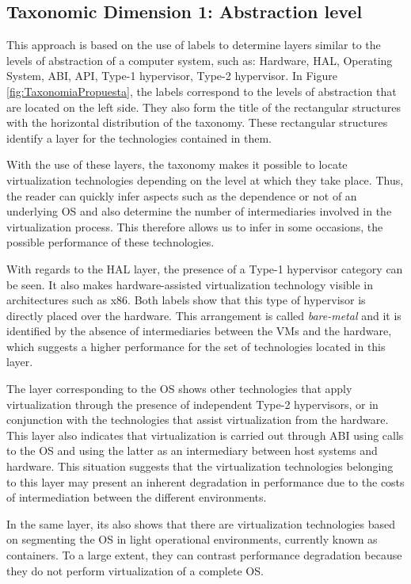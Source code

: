 	
	
	\subsection{Taxonomic Dimension 1: Abstraction level}

	This approach is based on the use of labels to determine layers similar to the levels of abstraction of a computer system, such as: Hardware, HAL, Operating System, ABI, API, Type-1 hypervisor, Type-2 hypervisor.   In Figure \ref{fig:TaxonomiaPropuesta}, the labels correspond to the levels of abstraction that are located on the left side. They also form the title of the rectangular structures with the horizontal distribution of the taxonomy. These rectangular structures identify a layer for the technologies contained in them.
	
	With the use of these layers, the taxonomy makes it possible to locate virtualization technologies depending on the level at which they take place. Thus, the reader can quickly infer aspects such as the dependence or not of an underlying OS and also determine the number of intermediaries involved in the virtualization process. This therefore allows us to infer in some occasions, the possible performance of these technologies.
	
	With regards to the HAL layer, the presence of a Type-1 hypervisor category can be seen. It also makes hardware-assisted virtualization technology visible in architectures such as x86. Both labels show that this type of hypervisor is directly placed over the hardware.  This arrangement is called \textit{bare-metal} and it is identified by the absence of intermediaries between the VMs and the hardware, which suggests a higher performance for the set of technologies located in this layer.
	
	The layer corresponding to the OS shows other technologies that apply virtualization through the presence of independent Type-2 hypervisors, or in conjunction with the technologies that assist virtualization from the hardware. This layer also indicates that virtualization is carried out through ABI using calls to the OS and using the latter as an intermediary between host systems and hardware. This situation suggests that the virtualization technologies belonging to this layer may present an inherent degradation in performance due to the costs of intermediation between the different environments.
	
	In the same layer, its also shows that there are virtualization technologies based on segmenting the OS in light operational environments, currently known as containers. To a large extent, they can contrast performance degradation because they do not perform virtualization of a complete OS.
	
